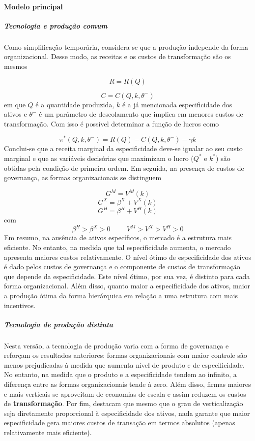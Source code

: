 \paragraph*{Modelo principal}

\subparagraph*{Tecnologia e produção comum}

Como simplificação temporária, considera-se que a produção independe da forma organizacional. Desse modo, as receitas e os custos de transformação são os mesmos

$$
R = R(Q)
$$

$$
C = C(Q, k, \theta^{-})
$$
em que $Q$ é a quantidade produzida, $k$ é a já mencionada especificidade dos ativos e $\theta^{-}$ é um parâmetro de descolamento que implica em menores custos de transformação. Com isso é possível determinar a função de lucros como

$$
\pi^*(Q,k, \theta^{-}) = R(Q) - C(Q, k, \theta^{-}) - \gamma k
$$
Conclui-se que a receita marginal da especificidade deve-se igualar ao seu custo marginal e que as variáveis decisórias que maximizam o lucro ($Q^*$ e $k^*$) são obtidas pela condição de primeira ordem. Em seguida, na presença de custos de governança, as formas organizacionais se distinguem 

$$
G^M = V^M(k)
$$
$$
G^X = \beta^X  + V^X(k)
$$
$$
G^H = \beta^H  + V^H(k)
$$
com
$$
\beta^H > \beta^X > 0 \hspace{1cm} V^M > V^X > V^H > 0
$$
Em resumo, na ausência de ativos específicos, o mercado é a estrutura mais eficiente. No entanto, na medida que tal especificidade aumenta, o mercado apresenta maiores custos relativamente. O nível ótimo de especificidade dos ativos é dado pelos custos de governança e o componente de custos de transformação que depende da especificidade.
Este nível ótimo, por sua vez, é distinto para cada forma organizacional. Além disso, quanto maior a especificidade dos ativos, maior a produção ótima da forma hierárquica em relação a uma estrutura com mais incentivos.

\subparagraph*{Tecnologia de produção distinta}

Nesta versão, a tecnologia de produção varia com a forma de governança e reforçam os resultados anteriores: formas organizacionais com maior controle são menos prejudicadas à medida que aumenta nível de produto e de especificidade. No entanto, na medida que o produto e a especificidade tendem ao infinito, a diferença entre as formas organizacionais tende à zero.
Além disso, firmas maiores e mais verticais se aproveitam de economias de escala e assim reduzem os custos de \textbf{transformação}.
Por fim, destacam que mesmo que o grau de verticalização seja diretamente proporcional à especificidade dos ativos, nada garante que maior especificidade gera maiores custos de transação em termos absolutos (apenas relativamente mais eficiente).


